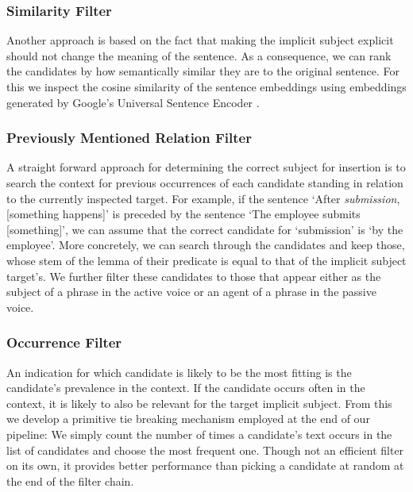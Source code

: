 \documentclass[times, 10pt,twocolumn]{article}
\begin{document}

\subsubsection{Similarity Filter}
Another approach is based on the fact that making the implicit subject explicit should not
change the meaning of the sentence. As a consequence, we can rank the candidates by how semantically
similar they are to the original sentence. For this we inspect the cosine similarity of the sentence
embeddings using embeddings generated by Google's Universal Sentence Encoder \cite{universal_sentence_encoder}.


\subsubsection{Previously Mentioned Relation Filter}
A straight forward approach for determining the correct subject for insertion is to search
the context for previous occurrences of each candidate standing in relation to the currently
inspected target. For example, if the sentence `After \textit{submission}, [something happens]'
is preceded by the sentence `The employee submits [something]', we can assume that the
correct candidate for `submission' is `by the employee'. More concretely, we can
search through the candidates and keep those, whose stem of the lemma of their predicate is equal to that
of the implicit subject target's. We further filter these candidates to those that appear either
as the subject of a phrase in the active voice or an agent of a phrase in the passive voice.


\subsubsection{Occurrence Filter}
An indication for which candidate is likely to be the most fitting is the candidate's prevalence in
the context. If the candidate occurs often in the context, it is likely to also be relevant for
the target implicit subject. From this we develop a primitive tie breaking mechanism employed at
the end of our pipeline: We simply count the number of times a candidate's text occurs in the
list of candidates and choose the most frequent one. Though not an efficient filter on its own,
it provides better performance than picking a candidate at random at the end of the filter chain.
\end{document}
